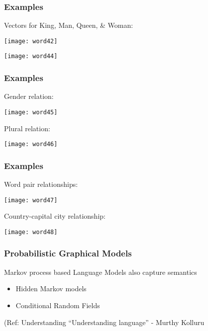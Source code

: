 \begin{frame}[fragile]\frametitle{Examples}
Vectors for King, Man, Queen, \& Woman:
\begin{center}
\texttt{[image: word42]}
\end{center}


\begin{center}
\texttt{[image: word44]}
\end{center}

\end{frame}

\begin{frame}[fragile]\frametitle{Examples}
Gender relation:
\begin{center}
\texttt{[image: word45]}
\end{center}
Plural relation:

\begin{center}
\texttt{[image: word46]}
\end{center}

\end{frame}


\begin{frame}[fragile]\frametitle{Examples}
Word pair relationships:
\begin{center}
\texttt{[image: word47]}
\end{center}
Country-capital city relationship:

\begin{center}
\texttt{[image: word48]}
\end{center}

\end{frame}



\begin{frame}[fragile]\frametitle{Probabilistic Graphical Models}
Markov process based Language Models also capture semantics

\begin{itemize}
\item  Hidden Markov models
\item Conditional Random Fields
\end{itemize}

{\tiny (Ref: Understanding ``Understanding language'' - Murthy Kolluru}

\end{frame}


